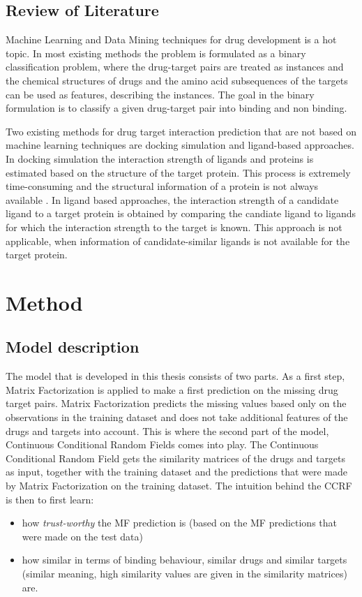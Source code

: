 \documentclass{sfuthesis}
\begin{document}
\section{Review of Literature}

Machine Learning and Data Mining techniques for drug development is a hot topic. In most existing methods the problem is formulated as a binary classification problem, where the drug-target pairs are treated as instances and the chemical structures of drugs and the amino acid subsequences of the targets can be used as features, describing the instances. The goal in the binary formulation is to classify a given drug-target pair into binding and non binding.

Two existing methods for drug target interaction prediction that are not based on machine learning techniques are docking simulation and ligand-based approaches. In docking simulation the interaction strength of ligands and proteins is estimated based on the structure of the target protein. This process is extremely time-consuming and the structural information of a protein is not always available \cite{liu2016neighborhood}. In ligand based approaches, the interaction strength of a candidate ligand to a target protein is obtained by comparing the candiate ligand to ligands for which the interaction strength to the target is known. This approach is not applicable, when information of candidate-similar ligands is not available for the target protein.

\chapter{Method}

\section{Model description}
The model that is developed in this thesis consists of two parts. As a first step, Matrix Factorization is applied to make a first prediction on the missing drug target pairs. Matrix Factorization predicts the missing values based only on the observations in the training dataset and does not take additional features of the drugs and targets into account. This is where the second part of the model, Continuous Conditional Random Fields comes into play. The Continuous Conditional Random Field gets the similarity matrices of the drugs and targets as input, together with the training dataset and the predictions that were made by Matrix Factorization on the training dataset. The intuition behind the CCRF is then to first learn:
\begin{itemize}
\item how \textit{trust-worthy} the MF prediction is (based on the MF predictions that were made on the test data)
\item how similar in terms of binding behaviour, similar drugs and similar targets (similar meaning, high similarity values are given in the similarity matrices) are.
\end{itemize}
\end{document}
